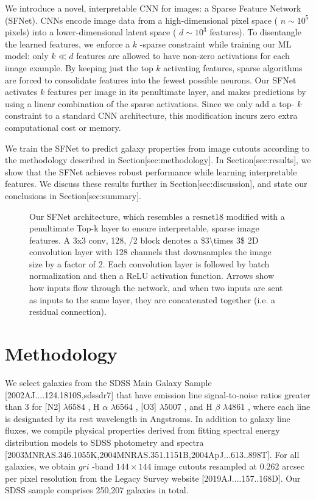 \documentclass[11pt,a4paper]{article}
\begin{document}
We introduce a novel, interpretable CNN for images: a Sparse Feature Network (SFNet). CNNs encode image data from a high-dimensional pixel space ( $n \sim 10^5$  pixels) into a lower-dimensional latent space ( $d \sim 10^3$  features). To disentangle the learned features, we enforce a  $k$ -sparse constraint while training our ML model: only  $k \ll d$  features are allowed to have non-zero activations for each image example. By keeping just the top  $k$  activating features, sparse algorithms are forced to consolidate features into the fewest possible neurons. Our SFNet activates  $k$  features per image in its penultimate layer, and makes predictions by using a linear combination of the sparse activations. Since we only add a top- $k$  constraint to a standard CNN architecture, this modification incurs zero extra computational cost or memory.

We train the SFNet to predict galaxy properties from image cutouts according to the methodology described in Section[sec:methodology]. In Section[sec:results], we show that the SFNet achieves robust performance while learning interpretable features. We discuss these results further in Section[sec:discussion], and state our conclusions in Section[sec:summary].

\begin{figure}[h]
\caption{Our SFNet architecture, which resembles a resnet18 modified with a penultimate Top-k layer to ensure interpretable, sparse image features. A 3x3 conv, 128, /2 block denotes a  \$3\textbackslash{}times 3\$  2D convolution layer with 128 channels that downsamples the image size by a factor of 2. Each convolution layer is followed by batch normalization and then a ReLU activation function. Arrows show how inputs flow through the network, and when two inputs are sent as inputs to the same layer, they are concatenated together (i.e. a residual connection).}
\end{figure}

\section{Methodology}

We select galaxies from the SDSS Main Galaxy Sample [2002AJ....124.1810S,sdssdr7] that have emission line signal-to-noise ratios greater than 3 for [N2]  $\lambda6584$ , H $\alpha$   $\lambda6564$ , [O3]  $\lambda5007$ , and H $\beta$   $\lambda4861$ , where each line is designated by its rest wavelength in Angstroms. In addition to galaxy line fluxes, we compile physical properties derived from fitting spectral energy distribution models to SDSS photometry and spectra [2003MNRAS.346.1055K,2004MNRAS.351.1151B,2004ApJ...613..898T]. For all galaxies, we obtain  $gri$ -band  $144\times 144$  image cutouts resampled at  $0.262$  arcsec per pixel resolution from the Legacy Survey website [2019AJ....157..168D]. Our SDSS sample comprises 250,207 galaxies in total.
\end{document}
